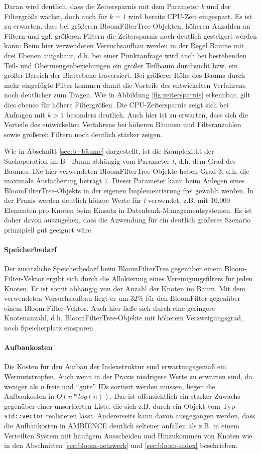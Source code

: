 Daran wird deutlich, dass die Zeitersparnis mit dem Parameter \textit{k} und der Filtergröße wächst, doch auch für $k=1$ wird bereits CPU-Zeit eingespart. Es ist zu erwarten, dass bei größeren BloomFilterTree-Objekten, höheren Anzahlen an Filtern und ggf. größeren Filtern die Zeitersparnis noch deutlich gesteigert werden kann: Beim hier verwendeten Versuchsaufbau werden in der Regel Bäume mit drei Ebenen aufgebaut, d.h. bei einer Punktanfrage wird auch bei bestehenden Teil- und Obermengenbeziehungen ein großer Teilbaum durchsucht bzw. ein großer Bereich der Blattebene traversiert. Bei größerer Höhe des Baums durch mehr eingefügte Filter kommen damit die Vorteile des entwickelten Verfahrens noch deutlicher zum Tragen. Wie in Abbildung \ref{fig:zeitersparnis} erkennbar, gilt dies ebenso für höhere Filtergrößen. Die CPU-Zeitersparnis zeigt sich bei Anfragen mit $k>1$ besonders deutlich. Auch hier ist zu erwarten, dass sich die Vorteile des entwickelten Verfahrens bei höheren Bäumen und Filteranzahlen sowie größeren Filtern noch deutlich stärker zeigen.

Wie in Abschnitt \ref{sec:b+bäume} dargestellt, ist die Komplexität der Suchoperation im B$^+$-Baum abhängig vom Parameter \textit{t}, d.h. dem Grad des Baumes. Die hier verwendeten Bloom\-Filter\-Tree-Objekte haben Grad 3, d.h. die maximale Ausfächerung beträgt 7. Dieser Parameter kann beim Anlegen eines BloomFilterTree-Objekts in der eigenen Implementierung frei gewählt werden. In der Praxis werden deutlich höhere Werte für \textit{t} verwendet, z.B. mit 10.000 Elementen pro Knoten beim Einsatz in Datenbank-Managementsystemen. Es ist daher davon auszugehen, dass die Anwendung für ein deutlich größeres Szenario prinzipiell gut geeignet wäre.  
\paragraph*{Speicherbedarf}
Der zusätzliche Speicherbedarf beim BloomFilterTree gegenüber einem Bloom-Filter-Vektor ergibt sich durch die Allokierung eines Vereinigungsfilters für jeden Knoten. Er ist somit abhängig von der Anzahl der Knoten im Baum. Mit dem verwendeten Versuchsaufbau liegt er um 32\% für den BloomFilter gegenüber einem Bloom-Filter-Vektor. Auch hier ließe sich durch eine geringere Knotenanzahl, d.h. BloomFilterTree-Objekte mit höherem Verzweigungsgrad, noch Speicherplatz einsparen.  
\paragraph*{Aufbaukosten}
Die Kosten für den Aufbau der Indexstruktur sind erwartungsgemäß ein Wermutstropfen. Auch wenn in der Praxis niedrigere Werte zu erwarten sind, da weniger als \textit{n} freie und "`gute"' IDs sortiert werden müssen, liegen die Aufbaukosten in $O(n\ast log(n))$. Das ist offensichtlich ein starker Zuwachs gegenüber einer unsortierten Liste, die sich z.B. durch ein Objekt vom Typ \texttt{std::vector} realisieren lässt. Andererseits kann davon ausgegangen werden, dass die Aufbaukosten in AMBIENCE deutlich seltener anfallen als z.B. in einem Verteilten System mit häufigem Ausscheiden und Hinzukommen von Knoten wie in den Abschnitten \ref{sec:bloom-netzwerk} und \ref{sec:bloom-index} beschrieben.
